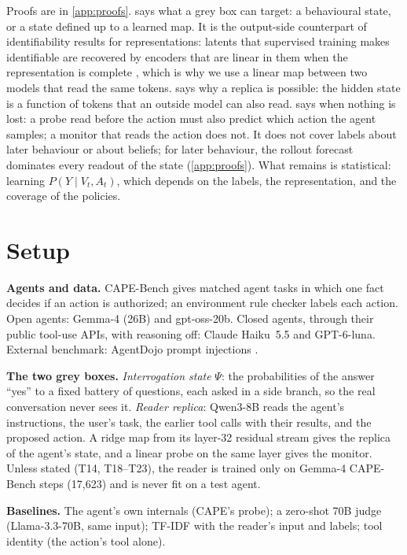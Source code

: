 \documentclass{article}
\begin{document}
Proofs are in \cref{app:proofs}.
 says what a grey box can target: a behavioural state, or a state defined up to a learned map. It is the output-side counterpart of identifiability results for representations: latents that supervised training makes identifiable are recovered by encoders that are linear in them when the representation is complete \citep{zhou2026identifiabilities}, which is why we use a linear map between two models that read the same tokens.
 says why a replica is possible: the hidden state is a function of tokens that an outside model can also read.
 says when nothing is lost: a probe read before the action must also predict which action the agent samples; a monitor that reads the action does not.
It does not cover labels about later behaviour or about beliefs; for later behaviour, the rollout forecast dominates every readout of the state (\cref{app:proofs}).
What remains is statistical: learning $P(Y\mid V_t,A_t)$, which depends on the labels, the representation, and the coverage of the policies.

\section{Setup}
\label{sec:setup}
\textbf{Agents and data.} CAPE-Bench \citep{fayyazi2026cape} gives matched agent tasks in which one fact decides if an action is authorized; an environment rule checker labels each action. Open agents: Gemma-4 (26B) and gpt-oss-20b. Closed agents, through their public tool-use APIs, with reasoning off: Claude Haiku~5.5 and GPT-6-luna. External benchmark: AgentDojo prompt injections \citep{debenedetti2024agentdojo}.

\textbf{The two grey boxes.} \emph{Interrogation state} $\Psi$: the probabilities of the answer ``yes'' to a fixed battery of questions, each asked in a side branch, so the real conversation never sees it. \emph{Reader replica}: Qwen3-8B reads the agent's instructions, the user's task, the earlier tool calls with their results, and the proposed action. A ridge map from its layer-32 residual stream gives the replica of the agent's state, and a linear probe on the same layer gives the monitor. Unless stated (T14, T18--T23), the reader is trained only on Gemma-4 CAPE-Bench steps (17{,}623) and is never fit on a test agent.

\textbf{Baselines.} The agent's own internals (CAPE's probe); a zero-shot 70B judge (Llama-3.3-70B, same input); TF-IDF with the reader's input and labels; tool identity (the action's tool alone).
\end{document}
